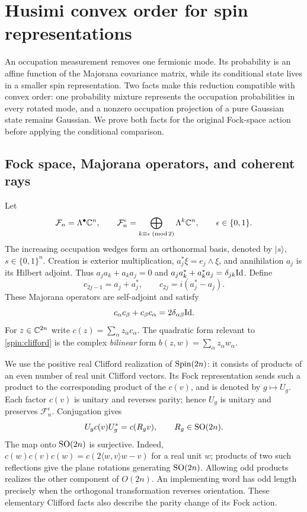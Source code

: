 \section{Husimi convex order for spin representations}
\label{sec:spin}
\label{spin:section}

An occupation measurement removes one fermionic mode.  Its probability is
an affine function of the Majorana covariance matrix, while its conditional
state lives in a smaller spin representation.  Two facts make this reduction
compatible with convex order: one probability mixture represents the
occupation probabilities in every rotated mode, and a nonzero occupation
projection of a pure Gaussian state remains Gaussian.  We prove both facts
for the original Fock-space action before applying the conditional comparison.

\subsection{Fock space, Majorana operators, and coherent rays}

Let
\[
 \mathcal F_n=\Lambda^\bullet\mathbb C^n,
 \qquad
 \mathcal F_n^\epsilon
 =\bigoplus_{k\equiv\epsilon\; (\mathrm{mod}\,2)}\Lambda^k\mathbb C^n,
 \qquad \epsilon\in\{0,1\}.
\]
The increasing occupation wedges form an orthonormal basis, denoted by
$|s\rangle$, $s\in\{0,1\}^n$.  Creation is exterior multiplication,
$a_j^*\xi=e_j\wedge\xi$, and annihilation $a_j$ is its Hilbert adjoint.
Thus $a_ja_k+a_ka_j=0$ and
$a_ja_k^*+a_k^*a_j=\delta_{jk}\mathrm{Id}$.  Define
\begin{equation}
 c_{2j-1}=a_j+a_j^*,\qquad c_{2j}=i(a_j^*-a_j).
 \label{spin:majorana}
\end{equation}
These Majorana operators are self-adjoint and satisfy
\begin{equation}
 c_\alpha c_\beta+c_\beta c_\alpha
 =2\delta_{\alpha\beta}\mathrm{Id}.
 \label{spin:clifford}
\end{equation}
For $z\in\mathbb C^{2n}$ write $c(z)=\sum_\alpha z_\alpha c_\alpha$.
The quadratic form relevant to \eqref{spin:clifford} is the complex
\emph{bilinear} form
$b(z,w)=\sum_\alpha z_\alpha w_\alpha$.

We use the positive real Clifford realization of $\operatorname{Spin}(2n)$: it consists
of products of an even number of real unit Clifford vectors.  Its Fock
representation sends such a product to the corresponding product of the
$c(v)$, and is denoted by $g\mapsto U_g$.  Each factor $c(v)$ is unitary
and reverses parity; hence $U_g$ is unitary and preserves
$\mathcal F_n^\epsilon$.  Conjugation gives
\begin{equation}
 U_g c(v)U_g^*=c(R_gv),\qquad R_g\in\operatorname{SO}(2n).
 \label{spin:orthogonal-action}
\end{equation}
The map onto $\operatorname{SO}(2n)$ is surjective.  Indeed,
$c(w)c(v)c(w)=c(2\langle w,v\rangle w-v)$ for a real unit $w$;
products of two such reflections give the plane rotations generating
$\operatorname{SO}(2n)$.  Allowing odd products realizes the other component of
$O(2n)$.  An implementing word has odd length precisely when the
orthogonal transformation reverses orientation.  These elementary
Clifford facts also describe the parity change of its Fock action.

